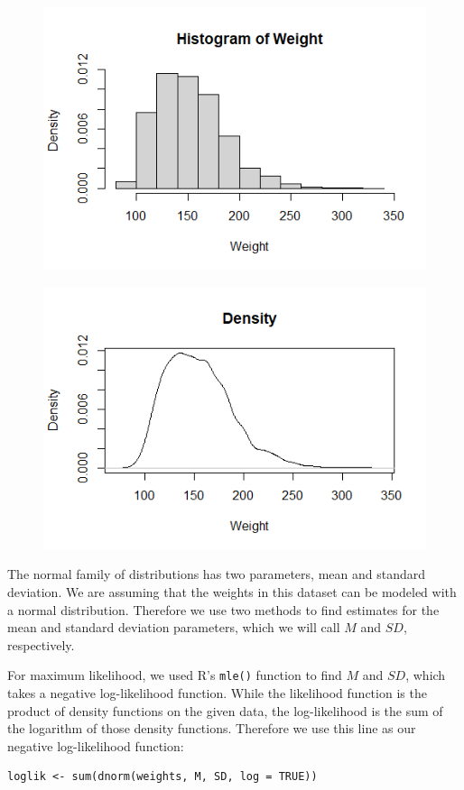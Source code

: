 \documentclass[12pt, a4paper, oneside]{report}
\begin{document}
\begin{figure}[h]
  \centering
  \includegraphics[width=0.7\linewidth]{normHist.png}
\end{figure}

\begin{figure}[h]
  \centering
  \includegraphics[width=0.7\linewidth]{normDensity.png}
\end{figure}

\newpage
The normal family of distributions has two parameters, mean and standard deviation. We are assuming that the weights in this dataset can be modeled with a normal distribution. Therefore we use two methods to find estimates for the mean and standard deviation parameters, which we will call \(M\) and \(SD\), respectively.

For maximum likelihood, we used R's \lstinline{mle()} function to find \(M\) and \(SD\), which takes a negative log-likelihood function. While the likelihood function is the product of density functions on the given data, the log-likelihood is the sum of the logarithm of those density functions. Therefore we use this line as our negative log-likelihood function:

\begin{lstlisting}
loglik <- sum(dnorm(weights, M, SD, log = TRUE))
\end{lstlisting}
\end{document}
